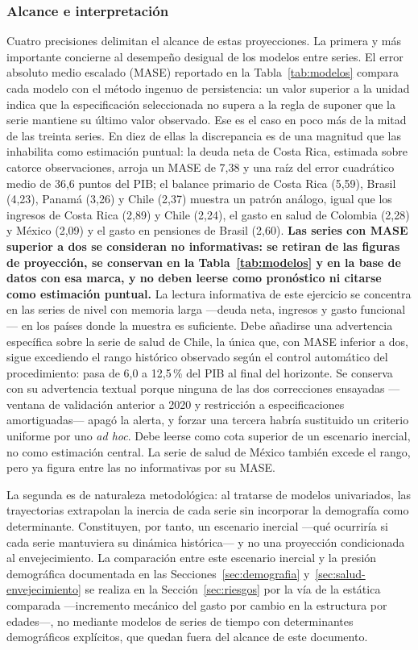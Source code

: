 \documentclass[12pt, letterpaper]{article}
\begin{document}
\subsubsection{Alcance e interpretación}
\label{sec:alcance-proy}

Cuatro precisiones delimitan el alcance de estas proyecciones. La primera y más
importante concierne al desempeño desigual de los modelos entre series. El error
absoluto medio escalado (MASE) reportado en la Tabla~\ref{tab:modelos} compara cada
modelo con el método ingenuo de persistencia: un valor superior a la unidad indica
que la especificación seleccionada no supera a la regla de suponer que la serie
mantiene su último valor observado. Ese es el caso en poco más de la mitad de las
treinta series. En diez de ellas la discrepancia es de una magnitud que las
inhabilita como estimación puntual: la deuda neta de Costa Rica, estimada sobre
catorce observaciones, arroja un MASE de 7,38 y una raíz del error cuadrático medio
de 36,6 puntos del PIB; el balance primario de Costa Rica (5,59), Brasil (4,23),
Panamá (3,26) y Chile (2,37) muestra un patrón análogo, igual que los ingresos de
Costa Rica (2,89) y Chile (2,24), el gasto en salud de Colombia (2,28) y México
(2,09) y el gasto en pensiones de Brasil (2,60). \textbf{Las series con MASE
superior a dos se consideran no informativas: se retiran de las figuras de
proyección, se conservan en la Tabla~\ref{tab:modelos} y en la base de datos con
esa marca, y no deben leerse como pronóstico ni citarse como estimación puntual.}
La lectura informativa de este ejercicio se concentra en las series de nivel con
memoria larga ---deuda neta, ingresos y gasto funcional--- en los países donde la
muestra es suficiente. Debe añadirse una advertencia específica sobre la serie
de salud de Chile, la única que, con MASE inferior a dos, sigue excediendo el rango
histórico observado según el control automático del procedimiento: pasa de 6,0 a
12,5\,\% del PIB al final del horizonte. Se conserva con su advertencia textual
porque ninguna de las dos correcciones ensayadas ---ventana de validación anterior
a 2020 y restricción a especificaciones amortiguadas--- apagó la alerta, y forzar
una tercera habría sustituido un criterio uniforme por uno \emph{ad hoc}. Debe
leerse como cota superior de un escenario inercial, no como estimación central. La
serie de salud de México también excede el rango, pero ya figura entre las no
informativas por su MASE.

La segunda es de naturaleza metodológica: al tratarse de modelos univariados, las
trayectorias extrapolan la inercia de cada serie sin incorporar la demografía como
determinante. Constituyen, por tanto, un escenario inercial —qué ocurriría si cada
serie mantuviera su dinámica histórica— y no una proyección condicionada al
envejecimiento. La comparación entre este escenario inercial y la presión
demográfica documentada en las Secciones~\ref{sec:demografia}
y~\ref{sec:salud-envejecimiento} se realiza en la Sección~\ref{sec:riesgos} por la
vía de la estática comparada ---incremento mecánico del gasto por cambio en la
estructura por edades---, no mediante modelos de series de tiempo con determinantes
demográficos explícitos, que quedan fuera del alcance de este documento.
\end{document}
